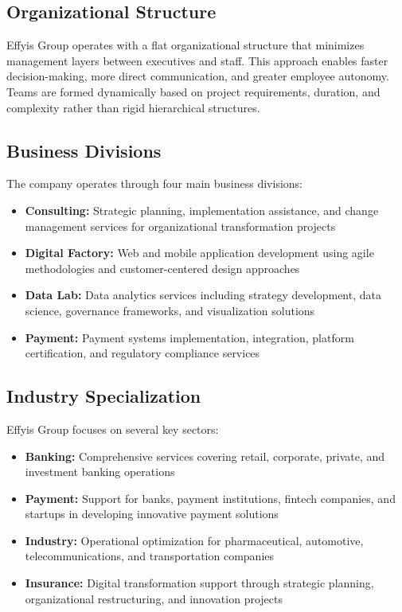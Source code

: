 \subsection{Organizational Structure}

Effyis Group operates with a flat organizational structure that minimizes management layers between executives and staff. This approach enables faster decision-making, more direct communication, and greater employee autonomy. Teams are formed dynamically based on project requirements, duration, and complexity rather than rigid hierarchical structures.

\subsection{Business Divisions}

The company operates through four main business divisions:

\begin{itemize}
    \item \textbf{Consulting:} Strategic planning, implementation assistance, and change management services for organizational transformation projects
    \item \textbf{Digital Factory:} Web and mobile application development using agile methodologies and customer-centered design approaches
    \item \textbf{Data Lab:} Data analytics services including strategy development, data science, governance frameworks, and visualization solutions
    \item \textbf{Payment:} Payment systems implementation, integration, platform certification, and regulatory compliance services
\end{itemize}

\subsection{Industry Specialization}

Effyis Group focuses on several key sectors:

\begin{itemize}
    \item \textbf{Banking:} Comprehensive services covering retail, corporate, private, and investment banking operations
    \item \textbf{Payment:} Support for banks, payment institutions, fintech companies, and startups in developing innovative payment solutions
    \item \textbf{Industry:} Operational optimization for pharmaceutical, automotive, telecommunications, and transportation companies
    \item \textbf{Insurance:} Digital transformation support through strategic planning, organizational restructuring, and innovation projects
\end{itemize}


